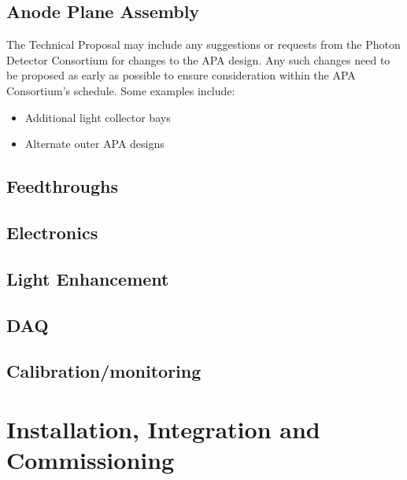 

\subsection{Anode Plane Assembly}
\label{sec:fdsp-pd-intfc-apa}

The Technical Proposal may include any suggestions or requests from the Photon Detector Consortium
for changes to the APA design. Any such changes need to be proposed as early as possible to ensure
consideration within the APA Consortium's schedule. Some examples include:
\begin{itemize}
\item Additional light collector bays
\item Alternate outer APA designs
\end{itemize}

\subsection{Feedthroughs}
\label{sec:fdsp-pd-intfc-feed}

\subsection{Electronics}
\label{sec:fdsp-pd-intfc-feed}

\subsection{Light Enhancement}
\label{sec:fdsp-pd-intfc-le}

\subsection{DAQ}
\label{sec:fdsp-pd-intfc-daq}

\subsection{Calibration/monitoring}
\label{sec:fdsp-pd-intfc-calib}



\section{Installation, Integration and Commissioning}
\label{sec:fdsp-pd-install}

